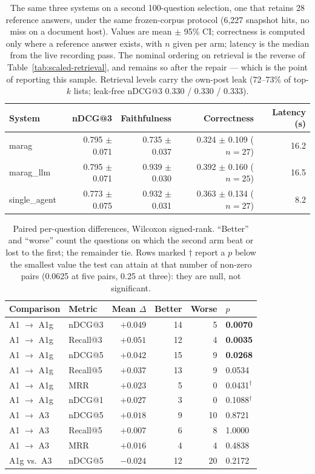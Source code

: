 \documentclass[acmsmall,anonymous,screen]{acmart}
\begin{document}
\begin{table}[t]
\caption{The same three systems on a second 100-question selection, one that
retains 28 reference answers, under the same frozen-corpus protocol (6{,}227
snapshot hits, no miss on a document host). Values are mean $\pm$ 95\% CI;
correctness is computed only where a reference answer exists, with $n$ given
per arm; latency is the median from the live recording pass. The nominal
ordering on retrieval is the reverse of Table~\ref{tab:scaled-retrieval}, and
remains so after the repair --- which is the point of reporting this sample.
Retrieval levels carry the own-post leak (72--73\% of top-$k$ lists; leak-free
nDCG@3 0.330 / 0.330 / 0.333).}
\label{tab:gt-run}
\begin{tabular}{lrrrr}
\toprule
System & nDCG@3 & Faithfulness & Correctness & Latency (s) \\
\midrule
marag         & 0.795 $\pm$ 0.071 & 0.735 $\pm$ 0.037 & 0.324 $\pm$ 0.109 ($n=27$) & 16.2 \\
marag\_llm    & 0.795 $\pm$ 0.071 & 0.939 $\pm$ 0.030 & 0.392 $\pm$ 0.160 ($n=25$) & 16.5 \\
single\_agent & 0.773 $\pm$ 0.075 & 0.932 $\pm$ 0.031 & 0.363 $\pm$ 0.134 ($n=27$) & 8.2 \\
\bottomrule
\end{tabular}
\end{table}

\begin{table}[t]
\caption{Paired per-question differences, Wilcoxon signed-rank. ``Better'' and
``worse'' count the questions on which the second arm beat or lost to the
first; the remainder tie. Rows marked $\dagger$ report a $p$ below the smallest
value the test can attain at that number of non-zero pairs (0.0625 at five
pairs, 0.25 at three): they are null, not significant.}
\label{tab:ladder-paired}
\begin{tabular}{llrrrl}
\toprule
Comparison & Metric & Mean $\Delta$ & Better & Worse & $p$ \\
\midrule
A1 $\to$ A1g  & nDCG@3   & $+0.049$ & 14 & 5  & \textbf{0.0070} \\
A1 $\to$ A1g  & Recall@3 & $+0.051$ & 12 & 4  & \textbf{0.0035} \\
A1 $\to$ A1g  & nDCG@5   & $+0.042$ & 15 & 9  & \textbf{0.0268} \\
A1 $\to$ A1g  & Recall@5 & $+0.037$ & 13 & 9  & 0.0534 \\
A1 $\to$ A1g  & MRR      & $+0.023$ & 5  & 0  & 0.0431$^\dagger$ \\
A1 $\to$ A1g  & nDCG@1   & $+0.027$ & 3  & 0  & 0.1088$^\dagger$ \\
\midrule
A1 $\to$ A3   & nDCG@5   & $+0.018$ & 9  & 10 & 0.8721 \\
A1 $\to$ A3   & Recall@5 & $+0.007$ & 6  & 8  & 1.0000 \\
A1 $\to$ A3   & MRR      & $+0.016$ & 4  & 4  & 0.4838 \\
\midrule
A1g vs.\ A3   & nDCG@5   & $-0.024$ & 12 & 20 & 0.2172 \\
\bottomrule
\end{tabular}
\end{table}
\end{document}
